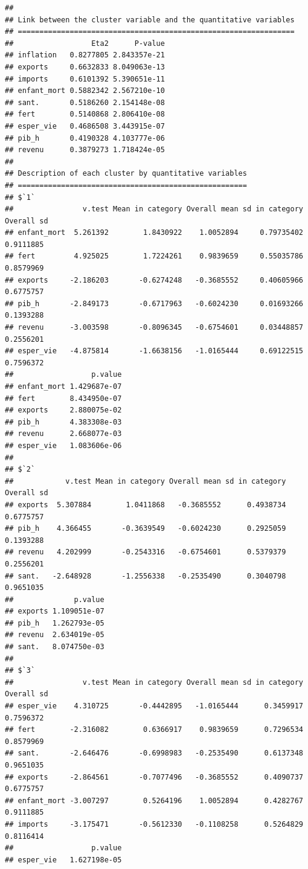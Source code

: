 \documentclass[
]{article}
\begin{document}
\begin{verbatim}
## 
## Link between the cluster variable and the quantitative variables
## ================================================================
##                  Eta2      P-value
## inflation   0.8277805 2.843357e-21
## exports     0.6632833 8.049063e-13
## imports     0.6101392 5.390651e-11
## enfant_mort 0.5882342 2.567210e-10
## sant.       0.5186260 2.154148e-08
## fert        0.5140868 2.806410e-08
## esper_vie   0.4686508 3.443915e-07
## pib_h       0.4190328 4.103777e-06
## revenu      0.3879273 1.718424e-05
## 
## Description of each cluster by quantitative variables
## =====================================================
## $`1`
##                v.test Mean in category Overall mean sd in category Overall sd
## enfant_mort  5.261392        1.8430922    1.0052894     0.79735402  0.9111885
## fert         4.925025        1.7224261    0.9839659     0.55035786  0.8579969
## exports     -2.186203       -0.6274248   -0.3685552     0.40605966  0.6775757
## pib_h       -2.849173       -0.6717963   -0.6024230     0.01693266  0.1393288
## revenu      -3.003598       -0.8096345   -0.6754601     0.03448857  0.2556201
## esper_vie   -4.875814       -1.6638156   -1.0165444     0.69122515  0.7596372
##                  p.value
## enfant_mort 1.429687e-07
## fert        8.434950e-07
## exports     2.880075e-02
## pib_h       4.383308e-03
## revenu      2.668077e-03
## esper_vie   1.083606e-06
## 
## $`2`
##            v.test Mean in category Overall mean sd in category Overall sd
## exports  5.307884        1.0411868   -0.3685552      0.4938734  0.6775757
## pib_h    4.366455       -0.3639549   -0.6024230      0.2925059  0.1393288
## revenu   4.202999       -0.2543316   -0.6754601      0.5379379  0.2556201
## sant.   -2.648928       -1.2556338   -0.2535490      0.3040798  0.9651035
##              p.value
## exports 1.109051e-07
## pib_h   1.262793e-05
## revenu  2.634019e-05
## sant.   8.074750e-03
## 
## $`3`
##                v.test Mean in category Overall mean sd in category Overall sd
## esper_vie    4.310725       -0.4442895   -1.0165444      0.3459917  0.7596372
## fert        -2.316082        0.6366917    0.9839659      0.7296534  0.8579969
## sant.       -2.646476       -0.6998983   -0.2535490      0.6137348  0.9651035
## exports     -2.864561       -0.7077496   -0.3685552      0.4090737  0.6775757
## enfant_mort -3.007297        0.5264196    1.0052894      0.4282767  0.9111885
## imports     -3.175471       -0.5612330   -0.1108258      0.5264829  0.8116414
##                  p.value
## esper_vie   1.627198e-05

\end{verbatim}
\end{document}

